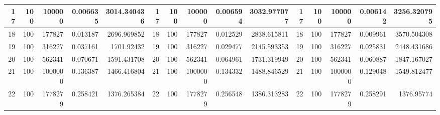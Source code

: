 \begin{table}[htbp]
\begin{tabular}{|r|r|r|r|r|r|r|r|r|r|r|r|r|r|r|}
		\midrule
		17                                & 100                             & 100000                          & 0.006635                           & 3014.340436                          & 17                               & 100                             & 100000                          & 0.006594                           & 3032.977077                          & 17 & 100   & 100000  & 0.006142 & 3256.320795 \\
		\midrule
		18                                & 100                             & 177827                          & 0.013187                           & 2696.969852                          & 18                               & 100                             & 177827                          & 0.012529                           & 2838.615811                          & 18 & 100   & 177827  & 0.009961 & 3570.504308 \\
		\midrule
		19                                & 100                             & 316227                          & 0.037161                           & 1701.92432                           & 19                               & 100                             & 316227                          & 0.029477                           & 2145.593353                          & 19 & 100   & 316227  & 0.025831 & 2448.431686 \\
		\midrule
		20                                & 100                             & 562341                          & 0.070671                           & 1591.431708                          & 20                               & 100                             & 562341                          & 0.064961                           & 1731.319949                          & 20 & 100   & 562341  & 0.060887 & 1847.167027 \\
		\midrule
		21                                & 100                             & 1000000                         & 0.136387                           & 1466.416804                          & 21                               & 100                             & 1000000                         & 0.134332                           & 1488.846529                          & 21 & 100   & 1000000 & 0.129048 & 1549.812477 \\
		\midrule
		22                                & 100                             & 1778279                         & 0.258421                           & 1376.265384                          & 22                               & 100                             & 1778279                         & 0.256548                           & 1386.313283                          & 22 & 100   & 1778279 & 0.258291 & 1376.95774  \\

\end{tabular}
\end{table}
